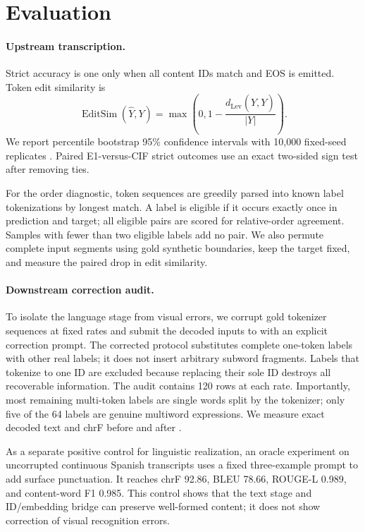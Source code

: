 \section{Evaluation}

\paragraph{Upstream transcription.}
Strict accuracy is one only when all content IDs match and EOS is emitted.  Token
edit similarity is
\begin{equation}
  \operatorname{EditSim}(\hat{Y},Y)=
  \max\left(0,1-\frac{d_{\mathrm{Lev}}(\hat{Y},Y)}{|Y|}\right).
\end{equation}
We report percentile bootstrap 95\% confidence intervals with 10,000 fixed-seed
replicates \citep{efron1979bootstrap}.  Paired E1-versus-CIF strict outcomes use an
exact two-sided sign test after removing ties.

For the order diagnostic, token sequences are greedily parsed into known label
tokenizations by longest match.  A label is eligible if it occurs exactly once in
prediction and target; all eligible pairs are scored for relative-order agreement.
Samples with fewer than two eligible labels add no pair.  We also permute complete
input segments using gold synthetic boundaries, keep the target fixed, and measure
the paired drop in edit similarity.

\paragraph{Downstream correction audit.}
To isolate the language stage from visual errors, we corrupt gold tokenizer
sequences at fixed rates and submit the decoded inputs to \Gemma{} with an explicit
correction prompt.  The corrected protocol substitutes complete one-token labels
with other real labels; it does not insert arbitrary subword fragments.  Labels
that tokenize to one ID are excluded because replacing their sole ID destroys all
recoverable information.  The audit contains 120 rows at each rate.  Importantly,
most remaining multi-token labels are single words split by the tokenizer; only
five of the 64 labels are genuine multiword expressions.  We measure exact decoded
text and chrF before and after \Gemma{}.

As a separate positive control for linguistic realization, an oracle experiment on
uncorrupted continuous Spanish transcripts uses a fixed three-example prompt to add
surface punctuation.  It reaches chrF 92.86, BLEU 78.66, ROUGE-L 0.989, and
content-word F1 0.985.  This control shows that the text stage and ID/embedding
bridge can preserve well-formed content; it does not show correction of visual
recognition errors.

